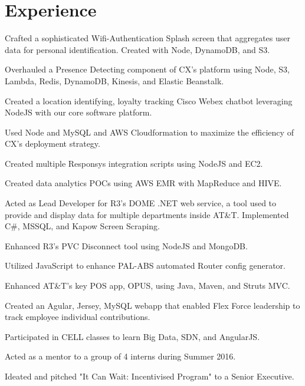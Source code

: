 \documentclass[]{deedy-resume-openfont}
\begin{document}
\begin{minipage}[t]{0.66\textwidth} 


\section{Experience}

\vspace{\topsep} %
\begin{tightemize}\item Crafted a sophisticated Wifi-Authentication Splash screen that aggregates user data for personal identification. Created with Node, DynamoDB, and S3.\item Overhauled a Presence Detecting component of CX's platform using Node, S3, Lambda, Redis, DynamoDB, Kinesis, and Elastic Beanstalk.\item Created a location identifying, loyalty tracking Cisco Webex chatbot leveraging NodeJS with our core software platform.\item Used Node and MySQL and AWS Cloudformation to maximize the efficiency of CX's deployment strategy.\item Created multiple Responsys integration scripts using NodeJS and EC2.\item Created data analytics POCs using AWS EMR with MapReduce and HIVE.
\end{tightemize}
\sectionsep

\begin{tightemize}
\item Acted as Lead Developer for R3’s DOME .NET web service, a tool used to provide and display data for multiple departments inside AT&T. Implemented C#, MSSQL, and Kapow Screen Scraping.\item Enhanced R3's PVC Disconnect tool using NodeJS and MongoDB.\item Utilized JavaScript to enhance PAL-ABS automated Router config generator.\item Enhanced AT\&T's key POS app, OPUS, using Java, Maven, and Struts MVC.\item Created an Agular, Jersey, MySQL webapp that enabled Flex Force leadership to track employee individual contributions.\item Participated in CELL classes to learn Big Data, SDN, and AngularJS.\item Acted as a mentor to a group of 4 interns during Summer 2016.\item Ideated and pitched "It Can Wait: Incentivised Program" to a Senior Executive.
\end{tightemize}
\sectionsep


\end{minipage}
\end{document}
